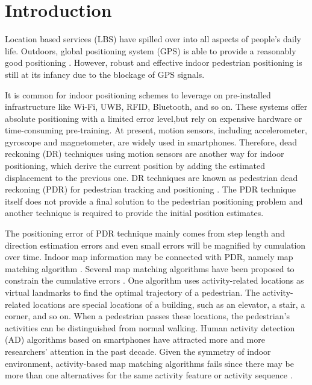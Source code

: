 \documentclass{llncs}
\begin{document}
\section{Introduction}
%
Location based services (LBS) have spilled over into all aspects of people's daily life. Outdoors, global positioning system (GPS) is able to provide a reasonably good positioning \cite{zampella2015indoor}. However, robust and effective indoor pedestrian positioning is still at its infancy due to the blockage of GPS signals.

It is common for indoor positioning schemes to leverage on pre-installed infrastructure like Wi-Fi\cite{bahl2000enhancements}, UWB\cite{Fontana2002}, RFID\cite{ni2004landmarc}, Bluetooth\cite{zafari2015enhancing}, and so on. These systems offer absolute positioning with a limited error level,but rely on expensive hardware or time-consuming pre-training. At present, motion sensors, including accelerometer, gyroscope and magnetometer, are widely used in smartphones. Therefore, dead reckoning (DR) techniques using motion sensors are another way for indoor positioning, which derive the current position by adding the estimated displacement to the previous one. DR techniques are known as  pedestrian dead reckoning (PDR) for pedestrian tracking and positioning \cite{fu2017crowdsourcing,alaoui2017points,zhou2015activity}. The PDR technique itself does not provide a final solution to the pedestrian positioning problem and another technique is required to provide the initial position estimates.

The positioning error of PDR technique mainly comes from step length and direction estimation errors and even small errors will be magnified by cumulation over time. Indoor map information may be connected with PDR, namely map matching algorithm \cite{aly2015semmatch}. Several map matching algorithms have been proposed to constrain the cumulative errors \cite{zhou2015activity,aly2015semmatch,zhou2015alimc,abdelnasser2016semanticslam,qiu2017iframe}.  One algorithm uses activity-related locations as virtual landmarks to find the optimal trajectory of a pedestrian. The activity-related locations are special locations of a building, such as an elevator, a stair, a corner, and so on. When a pedestrian passes these locations, the pedestrian's activities can be distinguished from normal walking. Human activity detection (AD) algorithms based on smartphones have attracted more and more researchers' attention in the past decade. Given the symmetry of indoor environment, activity-based map matching algorithms fails since there may be more than one alternatives for the same activity feature or activity sequence \cite{zhou2015activity}.
\end{document}

